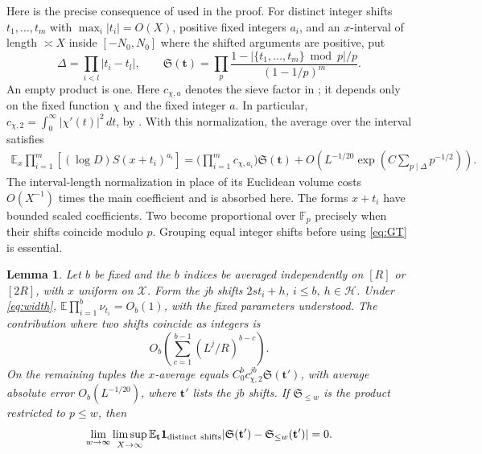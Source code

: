 \documentclass[11pt]{article}
\newtheorem{lemma}[theorem]{Lemma}
\newcommand{\E}{\mathbb E}
\newcommand{\one}{\mathbf 1}
\newcommand{\Sf}{\mathfrak S}
\begin{document}
Here is the precise consequence of \cite[Theorem D.3]{gt} used in the proof.
For distinct integer shifts \(t_1,\ldots,t_m\) with \(\max_i|t_i|=O(X)\),
positive fixed integers \(a_i\), and an \(x\)-interval of length \(\asymp X\)
inside \([-N_0,N_0]\) where the shifted arguments are positive, put
\[
 \Delta=\prod_{i<l}|t_i-t_l|,\qquad
 \Sf(\mathbf t)=\prod_p
 \frac{1-|\{t_1,\ldots,t_m\}\bmod p|/p}{(1-1/p)^m}.
\]
An empty product is one. Here \(c_{\chi,a}\) denotes the sieve factor in
\cite[Definition D.1]{gt}; it depends only on the fixed function \(\chi\)
and the fixed integer \(a\). In particular,
\(c_{\chi,2}=\int_0^\infty |\chi'(t)|^2\,dt\), by
\cite[Lemma D.2]{gt}. With this normalization, the average over the
interval satisfies
\begin{align}
 \E_x \prod_{i=1}^m [(\log D) S(x+t_i)^{a_i}]
 =\Big(\prod_{i=1}^m c_{\chi,a_i}\Big)\Sf(\mathbf t)
 +O\!\left(L^{-1/20}
       \exp\!\left(C\sum_{p\mid\Delta}p^{-1/2}\right)\right).
 \label{eq:GT}
\end{align}
The interval-length normalization in place of its Euclidean volume costs
\(O(X^{-1})\) times the main coefficient and is absorbed here.
The forms \(x+t_i\) have bounded scaled coefficients. Two become proportional
over \(\mathbb F_p\) precisely when their shifts coincide modulo \(p\).
Grouping equal integer shifts before using \eqref{eq:GT} is essential.

\begin{lemma}\label{lem:mom}
Let \(b\) be fixed and the \(b\) indices be averaged independently on
\([R]\) or \([2R]\), with \(x\) uniform on \(\mathcal X\). Form the \(jb\)
shifts \(2st_i+h\), \(i\le b,\ h\in\mathcal H\).
Under \eqref{eq:width},
\(\E\prod_{i=1}^b\nu_{t_i}=O_b(1)\), with the fixed parameters understood.
The contribution where two shifts coincide as integers is
\[
       O_b\!\left(\sum_{c=1}^{b-1}(L^j/R)^{b-c}\right).
\]
On the remaining tuples the \(x\)-average equals
\(C_0^b c_{\chi,2}^{jb}\Sf(\mathbf t')\), with average absolute error
\(O_b(L^{-1/20})\), where \(\mathbf t'\) lists the \(jb\) shifts.
If \(\Sf_{\le w}\) is the product restricted to \(p\le w\), then
\[
 \lim_{w\to\infty}\limsup_{X\to\infty}
 \E_{\mathbf t}\one_{\rm distinct\ shifts}
       |\Sf(\mathbf t')-\Sf_{\le w}(\mathbf t')|=0.
\]
\end{lemma}
\end{document}
